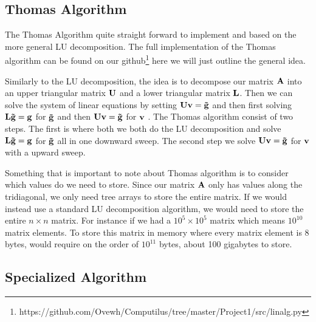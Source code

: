 \subsection*{Thomas Algorithm}
The Thomas Algorithm quite straight forward to implement and based on the more
general LU decomposition. The full implementation of the Thomas algorithm can be
found on our
github\footnote{https://github.com/Ovewh/Computilus/tree/master/Project1/src/linalg.py}
here we will just outline the general idea. \par Similarly to the LU
decomposition, the idea is to decompose our matrix $\mathbf{A}$ into an upper
triangular matrix $\mathbf{U}$ and a lower triangular matrix $\mathbf{L}$. Then we
can solve the system of linear equations by setting $\mathbf{U}\mathbf{v}=
\mathbf{\tilde{g}}$ and then first solving 
$\mathbf{L} \mathbf{\tilde{g}} = \mathbf{g}$ for $\mathbf{\tilde{g}}$ and then 
$\mathbf{U}\mathbf{v} = \mathbf{\tilde{g}}$ for $\mathbf{v}$
\cite{tridia}. The Thomas algorithm consist of two steps. The first is where
both we both do the LU decomposition and solve $\mathbf{L} \mathbf{\tilde{g}} =
\mathbf{g}$ for $\mathbf{\tilde{g}}$ all in one downward sweep. The second step we
solve $\mathbf{U}\mathbf{v} = \mathbf{\tilde{g}}$ for $\mathbf{v}$ with a upward sweep. 

Something that is important to note about Thomas algorithm is to consider which
values do we need to store. Since our matrix $\mathbf{A}$ only has values along
the tridiagonal, we only need tree arrays to store the entire matrix. If we
would instead use a standard LU decomposition algorithm, we would need to store
the entire $n \times n$ matrix. For instance if we had a $10^5 \times 10^5$   
matrix which means $10^10$ matrix elements. To store this matrix in memory where
every matrix element is 8 bytes, would require on the order of $10^{11}$ bytes, 
about 100 gigabytes to store. 

\subsection*{Specialized Algorithm}
